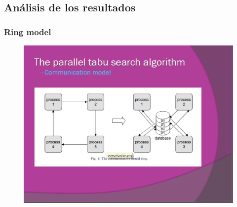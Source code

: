 \documentclass{beamer}
\begin{document}
\subsection{Análisis de los resultados}
\begin{frame}
\frametitle{Ring model }
\begin{figure}[!th]
\begin{center}
\includegraphics[width=1\textwidth]{img/picn12.eps}
\end{center}
\end{figure}
\end{frame}
\end{document}
